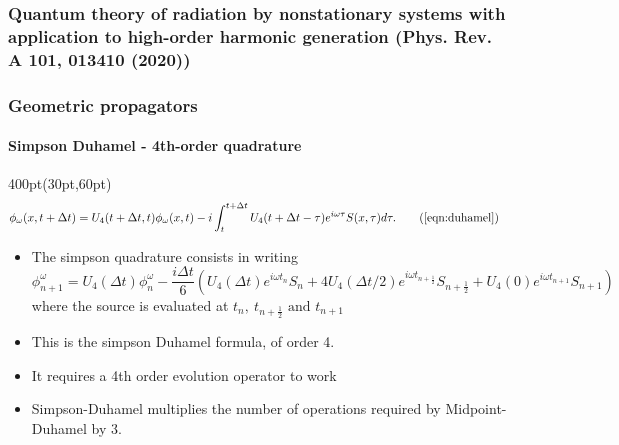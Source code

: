 \begin{frame}
\frametitle{Quantum theory of radiation by nonstationary systems 
	with application to high-order harmonic generation
        (Phys. Rev. A 101, 013410 (2020))}
\frametitle{Geometric propagators}
	\framesubtitle{Simpson Duhamel - 4th-order quadrature}
\footnotesize
\begin{textblock*}{400pt}(30pt,60pt)
\begin{align}
	\phi_\omega(x,t+\Delta t) & = U_4(t+\Delta t,t)\phi_\omega(x,t)
	  -i\int_{t}^{t+\Delta t} U_4(t+\Delta t-\tau)e^{i\omega \tau} S(x,\tau)d\tau. \tag{\ref{eqn:duhamel}}
\end{align}
\begin{itemize}
\item The simpson quadrature consists in writing
	\begin{equation}
		\phi^\omega_{n+1} = U_4(\Delta t) \phi^\omega_{n}
		- \frac{i\Delta t}{6}\left(
		  U_4(\Delta t)  e^{i\omega t_{n}}     S_{n}
		+ 4 U_4(\Delta t/2) e^{i\omega t_{n+\frac{1}{2}}} S_{n+\frac{1}{2}}
		+   U_4(0) e^{i\omega t_{n+1}} S_{n+1}
		\right)
		 \label{eqn:simpson_duhamel}
	\end{equation}
		where the source is evaluated at $t_n,\ t_{n+\frac{1}{2}}\mbox{ and } t_{n+1}$
		\vspace{20pt}
\item This is the simpson Duhamel formula, of order 4.
\item It requires a 4th order evolution operator to work
\item Simpson-Duhamel multiplies the number of operations required by 
	Midpoint-Duhamel by 3.
\end{itemize}

\end{textblock*}

\end{frame}




